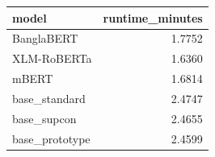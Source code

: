 \begin{tabular}{lr}
\toprule
model & runtime\_minutes \\
\midrule
BanglaBERT & 1.7752 \\
XLM-RoBERTa & 1.6360 \\
mBERT & 1.6814 \\
base\_standard & 2.4747 \\
base\_supcon & 2.4655 \\
base\_prototype & 2.4599 \\
\bottomrule
\end{tabular}
